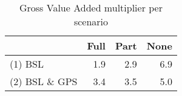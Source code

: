 \begin{table}[H]
\centering
\caption{\label{tab-multgva}Gross Value Added multiplier per scenario} 
\begin{tabular}{lrrr}
  \hline
 & Full & Part & None \\ 
  \hline
(1) BSL & 1.9 & 2.9 & 6.9 \\ 
  (2) BSL \& GPS & 3.4 & 3.5 & 5.0 \\ 
   \hline
\end{tabular}
\end{table}
